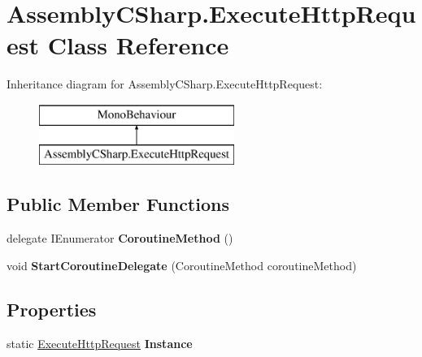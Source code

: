 \hypertarget{class_assembly_c_sharp_1_1_execute_http_request}{\section{Assembly\+C\+Sharp.\+Execute\+Http\+Request Class Reference}
\label{class_assembly_c_sharp_1_1_execute_http_request}
}
Inheritance diagram for Assembly\+C\+Sharp.\+Execute\+Http\+Request\+:\begin{figure}[H]
\begin{center}
\leavevmode
\includegraphics[height=2.000000cm]{class_assembly_c_sharp_1_1_execute_http_request}
\end{center}
\end{figure}
\subsection*{Public Member Functions}
\begin{DoxyCompactItemize}
\item 
\hypertarget{class_assembly_c_sharp_1_1_execute_http_request_a8ee2811c5c3d767a814b4a04a8e71854}{delegate I\+Enumerator {\bfseries Coroutine\+Method} ()}\label{class_assembly_c_sharp_1_1_execute_http_request_a8ee2811c5c3d767a814b4a04a8e71854}

\item 
\hypertarget{class_assembly_c_sharp_1_1_execute_http_request_a95797c8099eb7de7d50fb7a6379fbdbc}{void {\bfseries Start\+Coroutine\+Delegate} (Coroutine\+Method coroutine\+Method)}\label{class_assembly_c_sharp_1_1_execute_http_request_a95797c8099eb7de7d50fb7a6379fbdbc}

\end{DoxyCompactItemize}
\subsection*{Properties}
\begin{DoxyCompactItemize}
\item 
\hypertarget{class_assembly_c_sharp_1_1_execute_http_request_a536f55306002ded3e8e70ee9c38008ff}{static \hyperlink{class_assembly_c_sharp_1_1_execute_http_request}{Execute\+Http\+Request} {\bfseries Instance}}\label{class_assembly_c_sharp_1_1_execute_http_request_a536f55306002ded3e8e70ee9c38008ff}

\end{DoxyCompactItemize}
